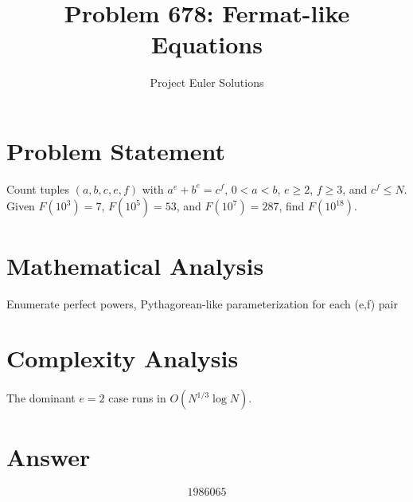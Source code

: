 \documentclass[11pt]{article}
\title{Problem 678: Fermat-like Equations}
\author{Project Euler Solutions}
\date{}
\begin{document}
\maketitle

\section{Problem Statement}

Count tuples $(a,b,c,e,f)$ with $a^e + b^e = c^f$, $0<a<b$, $e\ge 2$, $f\ge 3$, and $c^f \le N$. Given $F(10^3)=7$, $F(10^5)=53$, and $F(10^7)=287$, find $F(10^{18})$.

\section{Mathematical Analysis}

Enumerate perfect powers, Pythagorean-like parameterization for each (e,f) pair

\section{Complexity Analysis}

The dominant $e=2$ case runs in $O(N^{1/3} \log N)$.

\section{Answer}

\[
\boxed{1986065}
\]
\end{document}
